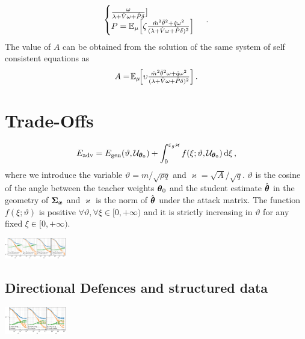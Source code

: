 \documentclass[a0paper,fleqn]{betterportraitposter}
\theoremstyle{plain}
\theoremstyle{definition}
\theoremstyle{remark}
\begin{document}
{\begin{multicols}{3}
\begin{equation}
\begin{cases}
            \frac{\omega}{\lambda + \hat{V} \omega + \hat{P} \delta } 
        ] \\
        P = \mathbb{E}_{\mu} \qty[ 
            \zeta \frac{
                \hat{m}^2 \bar{\theta}^2 + \hat{q} \omega^2
            }{
                (\lambda + \hat{V} \omega + \hat{P} \delta)^2
            } 
        ] 
    \end{cases}\,.
\end{equation}
The value of \(A\) can be obtained from the solution of the same system of self consistent equations as
\begin{equation}
    A = \! \mathbb{E}_{\mu} \! \qty[ 
    {\textstyle
        \upsilon \frac{\hat{m}^2 \bar{\theta}^2 \omega + \hat{q} \omega^2}{(\lambda + \hat{V} \omega + \hat{P} \delta)^2} 
    }
    ] \,.
\end{equation}


\section{Trade-Offs}

\begin{equation}
    E_{\mathrm{adv}} = 
    {
        E_{\mathrm{gen}}(\vartheta, \mathcal{U}_{\boldsymbol{\theta}_0}) + 
        \int_{0}^{\varepsilon_g \varkappa } 
        f(\xi; \vartheta, \mathcal{U}_{\boldsymbol{\theta}_0}) \dd{\xi}
    } \,,
\end{equation}
where we introduce the variable \(\vartheta = m / \sqrt{\rho q}\) and \(\varkappa = \sqrt{A} / \sqrt{q}\). 
\(\vartheta\) is the cosine of the angle between the teacher weights \(\boldsymbol{\theta}_0\) and the student estimate \(\hat{\boldsymbol{\theta}}\) in the geometry of \(\boldsymbol{\Sigma}_{\boldsymbol{\boldsymbol{x}}}\) and \(\varkappa\) is the norm of \(\hat{\boldsymbol{\theta}}\) under the attack matrix.
The function \(f(\xi;\vartheta)\) is positive \(\forall \vartheta, \forall \xi \in [0, +\infty)\) and it is strictly increasing in \(\vartheta\) for any fixed \(\xi \in [0,+\infty)\). 

\includegraphics[width=0.2\textwidth]{Assets/feature_combinations_alpha_sweep.pdf}


\subsection{Directional Defences and structured data}

\includegraphics[width=0.2\textwidth]{Assets/defence_sweep.pdf}



\end{multicols}}
\end{document}
